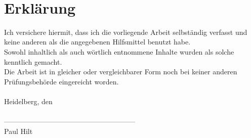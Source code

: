 ~\label{sec:ref}
\section*{Erklärung}
Ich versichere hiermit, dass ich die vorliegende Arbeit selbständig verfasst und keine anderen als die angegebenen Hilfsmittel benutzt habe.\\
Sowohl inhaltlich als auch wörtlich entnommene Inhalte wurden als solche kenntlich gemacht.\\
Die Arbeit ist in gleicher oder vergleichbarer Form noch bei keiner anderen Prüfungsbehörde eingereicht worden.\\
\vspace{1cm}\\
Heidelberg, den\\
\vspace{2cm}\\

--------------------------------------------------------\\
Paul Hilt